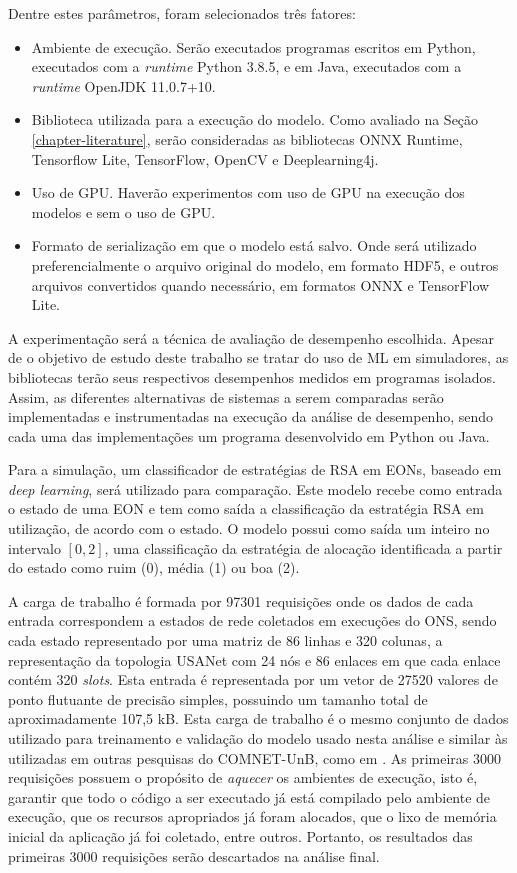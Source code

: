 Dentre estes parâmetros, foram selecionados três fatores:

\begin{itemize}
    \item Ambiente de execução. Serão executados programas escritos em Python, executados com a \textit{runtime} Python 3.8.5, e em Java, executados com a \textit{runtime} OpenJDK 11.0.7+10.
    \item Biblioteca utilizada para a execução do modelo. Como avaliado na Seção \ref{chapter-literature}, serão consideradas as bibliotecas ONNX Runtime, Tensorflow Lite, TensorFlow, OpenCV e Deeplearning4j.
    \item Uso de GPU. Haverão experimentos com uso de GPU na execução dos modelos e sem o uso de GPU.
    \item Formato de serialização em que o modelo está salvo. Onde será utilizado preferencialmente o arquivo original do modelo, em formato HDF5, e outros arquivos convertidos quando necessário, em formatos ONNX e TensorFlow Lite.
\end{itemize}

A experimentação será a técnica de avaliação de desempenho escolhida. Apesar de o objetivo de estudo deste trabalho se tratar do uso de ML em simuladores, as bibliotecas terão seus respectivos desempenhos medidos em programas isolados. Assim, as diferentes alternativas de sistemas a serem comparadas serão implementadas e instrumentadas na execução da análise de desempenho, sendo cada uma das implementações um programa desenvolvido em Python ou Java.

Para a simulação, um classificador de estratégias de RSA em EONs, baseado em \textit{deep learning}, será utilizado para comparação. Este modelo recebe como entrada o estado de uma EON e tem como saída a classificação da estratégia RSA em utilização, de acordo com o estado. O modelo possui como saída um inteiro no intervalo $[0, 2]$, uma classificação da estratégia de alocação identificada a partir do estado como ruim (0), média (1) ou boa (2).

A carga de trabalho é formada por 97301 requisições onde os dados de cada entrada correspondem a estados de rede coletados em execuções do ONS, sendo cada estado representado por uma matriz de 86 linhas e 320 colunas, a representação da topologia USANet com 24 nós e 86 enlaces em que cada enlace contém 320 \textit{slots}. Esta entrada é representada por um vetor de 27520 valores de ponto flutuante de precisão simples, possuindo um tamanho total de aproximadamente 107,5 kB. Esta carga de trabalho é o mesmo conjunto de dados utilizado para treinamento e validação do modelo usado nesta análise e similar às utilizadas em outras pesquisas do \acrfull{COMNET-UnB}, como em \cite{eon_ml_classifier_2020}. As primeiras 3000 requisições possuem o propósito de \textit{aquecer} os ambientes de execução, isto é, garantir que todo o código a ser executado já está compilado pelo ambiente de execução, que os recursos apropriados já foram alocados, que o lixo de memória inicial da aplicação já foi coletado, entre outros. Portanto, os resultados das primeiras 3000 requisições serão descartados na análise final.

